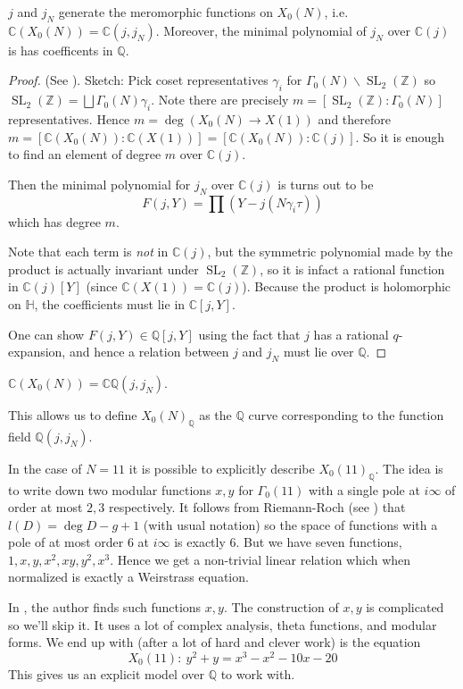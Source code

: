 \documentclass[11pt]{article}
\newcommand{\BB}[1]{\mathbb{#1}} %
\newcommand{\CC}{\BB{C}}
\newcommand{\QQ}{\BB{Q}}
\newcommand{\ZZ}{\BB{Z}}
\newcommand{\HH}{\BB{H}}
\newcommand{\SL}{\operatorname{SL}}
\theoremstyle{plain}
\theoremstyle{remark}
\begin{document}
\begin{thm}\label{C(X_0(N))}
	$j$ and $j_N$ generate the meromorphic functions on $X_0(N)$, i.e. $\CC(X_0(N)) = \CC(j,j_N)$. Moreover, the minimal polynomial of $j_N$ over $\CC(j)$ is has coefficents in $\QQ$.
\end{thm}
\begin{proof}(See \cite[Chapter 5 Section 2]{milne}). Sketch:
	Pick coset representatives $\gamma_i$ for $\Gamma_0(N)\backslash\SL_2(\ZZ)$ so $\SL_2(\ZZ) = \bigsqcup \Gamma_0(N)\gamma_i$. Note there are precisely $m = [\SL_2(\ZZ):\Gamma_0(N)]$ representatives. Hence $m = \deg(X_0(N) \to X(1))$ and therefore $m = [\CC(X_0(N)):\CC(X(1))] = [\CC(X_0(N)):\CC(j)]$. So it is enough to find an element of degree $m$ over $\CC(j)$.

	Then the minimal polynomial for $j_N$ over $\CC(j)$ is turns out to be
	$$
	F(j,Y) = \prod \left(Y - j(N\gamma_i\tau)\right)
	$$
	which has degree $m$.

	Note that each term is \emph{not} in $\CC(j)$, but the symmetric polynomial made by the product is actually invariant under $\SL_2(\ZZ)$, so it is infact a rational function in $\CC(j)[Y]$ (since $\CC(X(1)) = \CC(j)$). Because the product is holomorphic on $\HH$, the coefficients must lie in $\CC[j,Y]$.

	One can show $F(j,Y)\in\QQ[j,Y]$ using the fact that $j$ has a rational $q$-expansion, and hence a relation between $j$ and $j_N$ must lie over $\QQ$.
\end{proof}

\begin{cor}
	$\CC(X_0(N)) = \CC\QQ(j,j_N)$.
\end{cor}

This allows us to define $X_0(N)_\QQ$ as the $\QQ$ curve corresponding to the function field $\QQ(j,j_N)$.

\begin{ex}
	In the case of $N = 11$ it is possible to explicitly describe $X_0(11)_\QQ$. The idea is to write down two modular functions $x,y$ for $\Gamma_0(11)$ with a single pole at $i\infty$ of order at most $2,3$ respectively. It follows from Riemann-Roch (see \cite[Chapter II Section 5 Corollary 5.5c]{silverman1}) that $l(D) = \deg D - g + 1$ (with usual notation) so the space of functions with a pole of at most order $6$ at $i\infty$ is exactly $6$. But we have seven functions, $1,x,y,x^2,xy,y^2,x^3$. Hence we get a non-trivial linear relation which when normalized is exactly a Weirstrass equation.

	In \cite[Section 4]{weston}, the author finds such functions $x,y$. The construction of $x,y$ is complicated so we'll skip it. It uses a lot of complex analysis, theta functions, and modular forms. We end up with (after a lot of hard and clever work) is the equation
	$$
	X_0(11)\colon~ y^2 + y = x^3 - x^2 - 10x - 20
	$$
	This gives us an explicit model over $\QQ$ to work with.
\end{ex}
\end{document}
